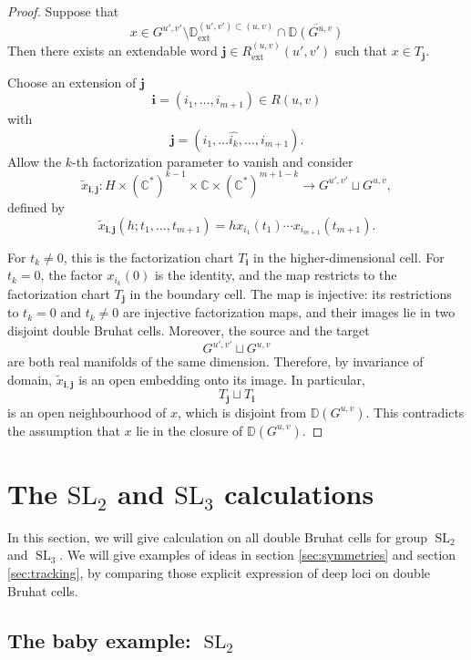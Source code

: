 \documentclass[12pt]{amsart}
\newcommand{\D}{\mathbb D}
\newcommand{\SL}{\operatorname{SL}}
\theoremstyle{plain}
\theoremstyle{definition}
\theoremstyle{remark}
\begin{document}
\begin{proof}
Suppose that
\[
x\in
G^{u',v'}
\setminus
\D_{\mathrm{ext}}^{(u',v')\subset(u,v)}
\cap
\overline{\D(G^{u,v})}
\]
Then there exists an extendable word
\(
\mathbf j\in R_{\mathrm{ext}}^{(u,v)}(u',v')
\)
such that
\(
x\in T_{\mathbf j}.
\)


Choose an extension of $\mathbf j$
\[
\mathbf i=(i_1,\ldots,i_{m+1})\in R(u,v)
\]
with
\[
\mathbf j=(i_1,\ldots\hat{i_k},\ldots,i_{m+1}).
\]
 Allow the
$k$-th factorization parameter to vanish and consider
\[
\widetilde{x}_{\mathbf i,\mathbf j}:H\times(\mathbb C^*)^{k-1}\times\mathbb C\times(\mathbb C^*)^{m+1-k}\longrightarrow G^{u',v'}\sqcup G^{u,v},
\]
defined by
\[
\widetilde{x}_{\mathbf i,\mathbf j}
(h;t_1,\ldots,t_{m+1})
=
h x_{i_1}(t_1)\cdots x_{i_{m+1}}(t_{m+1}).
\]

For $t_k\neq0$, this is the factorization chart $T_{\mathbf i}$ in the higher-dimensional cell. For $t_k=0$, the factor $x_{i_k}(0)$ is the identity, and the map restricts to the factorization chart $T_{\mathbf j}$ in the boundary cell. The map is injective: its restrictions to $t_k=0$ and $t_k\neq0$ are injective factorization maps, and their images lie in two
disjoint double Bruhat cells. Moreover, the source and the target
\[
G^{u',v'}\sqcup G^{u,v}
\]
are both real manifolds of the same dimension. Therefore, by invariance of domain,
$\widetilde{x}_{\mathbf i,\mathbf j}$ is an open embedding onto its image.
In particular,
\[
T_{\mathbf j}\sqcup T_{\mathbf i}
\]
is an open neighbourhood of $x$, which is disjoint from $\D(G^{u,v})$. This contradicts the assumption that $x$ lie in the closure of $\D(G^{u,v})$.
\end{proof}




\section{The \texorpdfstring{$\mathrm{SL}_2$}{SL2} and \texorpdfstring{$\mathrm{SL}_3$}{SL3} calculations}\label{sec:sl2sl3}

In this section, we will give calculation on all double Bruhat cells for group $\SL_2$ and $\SL_3$. We will give examples of ideas in section \ref{sec:symmetries} and section \ref{sec:tracking}, by comparing those explicit expression of deep loci on double Bruhat cells.

\subsection{The baby example: \texorpdfstring{$\SL_2$}{SL2}}
\end{document}
